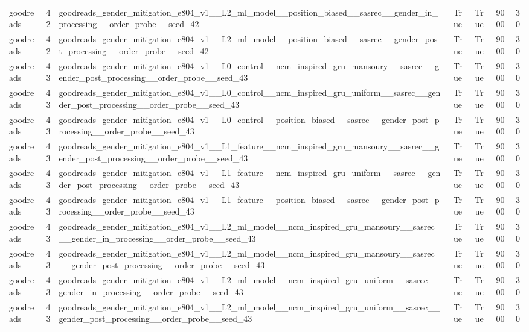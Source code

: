 \begin{table}[htbp!]
\begin{tabular}{lrlrrrr}
goodreads & 42 & goodreads\_gender\_mitigation\_e804\_v1\_\_L2\_ml\_model\_\_position\_biased\_\_sasrec\_\_gender\_in\_processing\_\_order\_probe\_\_seed\_42 & True & True & 9000 & 30 \\
goodreads & 42 & goodreads\_gender\_mitigation\_e804\_v1\_\_L2\_ml\_model\_\_position\_biased\_\_sasrec\_\_gender\_post\_processing\_\_order\_probe\_\_seed\_42 & True & True & 9000 & 30 \\
goodreads & 43 & goodreads\_gender\_mitigation\_e804\_v1\_\_L0\_control\_\_ncm\_inspired\_gru\_mansoury\_\_sasrec\_\_gender\_post\_processing\_\_order\_probe\_\_seed\_43 & True & True & 9000 & 30 \\
goodreads & 43 & goodreads\_gender\_mitigation\_e804\_v1\_\_L0\_control\_\_ncm\_inspired\_gru\_uniform\_\_sasrec\_\_gender\_post\_processing\_\_order\_probe\_\_seed\_43 & True & True & 9000 & 30 \\
goodreads & 43 & goodreads\_gender\_mitigation\_e804\_v1\_\_L0\_control\_\_position\_biased\_\_sasrec\_\_gender\_post\_processing\_\_order\_probe\_\_seed\_43 & True & True & 9000 & 30 \\
goodreads & 43 & goodreads\_gender\_mitigation\_e804\_v1\_\_L1\_feature\_\_ncm\_inspired\_gru\_mansoury\_\_sasrec\_\_gender\_post\_processing\_\_order\_probe\_\_seed\_43 & True & True & 9000 & 30 \\
goodreads & 43 & goodreads\_gender\_mitigation\_e804\_v1\_\_L1\_feature\_\_ncm\_inspired\_gru\_uniform\_\_sasrec\_\_gender\_post\_processing\_\_order\_probe\_\_seed\_43 & True & True & 9000 & 30 \\
goodreads & 43 & goodreads\_gender\_mitigation\_e804\_v1\_\_L1\_feature\_\_position\_biased\_\_sasrec\_\_gender\_post\_processing\_\_order\_probe\_\_seed\_43 & True & True & 9000 & 30 \\
goodreads & 43 & goodreads\_gender\_mitigation\_e804\_v1\_\_L2\_ml\_model\_\_ncm\_inspired\_gru\_mansoury\_\_sasrec\_\_gender\_in\_processing\_\_order\_probe\_\_seed\_43 & True & True & 9000 & 30 \\
goodreads & 43 & goodreads\_gender\_mitigation\_e804\_v1\_\_L2\_ml\_model\_\_ncm\_inspired\_gru\_mansoury\_\_sasrec\_\_gender\_post\_processing\_\_order\_probe\_\_seed\_43 & True & True & 9000 & 30 \\
goodreads & 43 & goodreads\_gender\_mitigation\_e804\_v1\_\_L2\_ml\_model\_\_ncm\_inspired\_gru\_uniform\_\_sasrec\_\_gender\_in\_processing\_\_order\_probe\_\_seed\_43 & True & True & 9000 & 30 \\
goodreads & 43 & goodreads\_gender\_mitigation\_e804\_v1\_\_L2\_ml\_model\_\_ncm\_inspired\_gru\_uniform\_\_sasrec\_\_gender\_post\_processing\_\_order\_probe\_\_seed\_43 & True & True & 9000 & 30 \\

\end{tabular}
\end{table}
